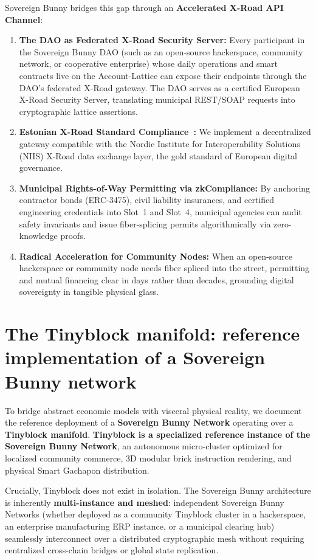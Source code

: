\documentclass[a4paper,11pt,twoside,parskip=half-,headings=small]{scrartcl}
\begin{document}
Sovereign Bunny bridges this gap through an \textbf{Accelerated X-Road API Channel}:
\begin{enumerate}
  \item \textbf{The DAO as Federated X-Road Security Server:} Every participant in the Sovereign Bunny DAO
(such as an open-source hackerspace, community network, or cooperative enterprise) whose daily operations and smart contracts
live on the Account-Lattice can expose their endpoints through the DAO's federated X-Road gateway. The DAO serves as a certified
European X-Road Security Server, translating municipal REST/SOAP requests into cryptographic lattice assertions.
  \item \textbf{Estonian X-Road Standard Compliance~\cite{xroad2023}:} We implement a decentralized
gateway compatible with the Nordic Institute for Interoperability Solutions (NIIS) X-Road
data exchange layer, the gold standard of European digital governance.
  \item \textbf{Municipal Rights-of-Way Permitting via zkCompliance:} By anchoring contractor bonds
(ERC-3475), civil liability insurances, and certified engineering credentials into Slot~1
and Slot~4, municipal agencies can audit safety invariants and issue fiber-splicing permits
algorithmically via zero-knowledge proofs.
  \item \textbf{Radical Acceleration for Community Nodes:} When an open-source hackerspace or
community node needs fiber spliced into the street, permitting and mutual financing clear
in days rather than decades, grounding digital sovereignty in tangible physical glass.
\end{enumerate}

\section{The Tinyblock manifold: reference implementation of a Sovereign Bunny network}
\label{sec:tinyblock_manifold}

To bridge abstract economic models with visceral physical reality, we document
the reference deployment of a \textbf{Sovereign Bunny Network} operating over a
\textbf{Tinyblock manifold}. \textbf{Tinyblock is a specialized reference instance of the Sovereign Bunny Network}, an autonomous micro-cluster optimized for localized community commerce, 3D modular brick instruction rendering, and physical Smart Gachapon distribution.

Crucially, Tinyblock does not exist in isolation. The Sovereign Bunny architecture is inherently \textbf{multi-instance and meshed}: independent Sovereign Bunny Networks (whether deployed as a community Tinyblock cluster in a hackerspace, an enterprise manufacturing ERP instance, or a municipal clearing hub) seamlessly interconnect over a distributed cryptographic mesh without requiring centralized cross-chain bridges or global state replication.
\end{document}
